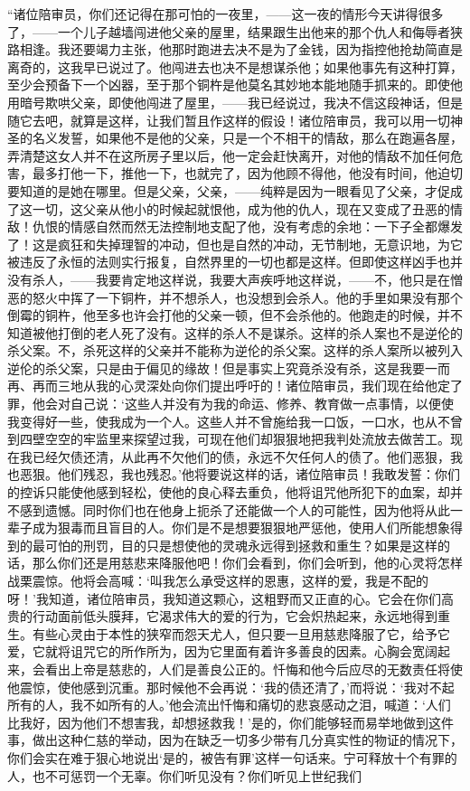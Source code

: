 \par “诸位陪审员，你们还记得在那可怕的一夜里，——这一夜的情形今天讲得很多了，——一个儿子越墙闯进他父亲的屋里，结果跟生出他来的那个仇人和侮辱者狭路相逢。我还要竭力主张，他那时跑进去决不是为了金钱，因为指控他抢劫简直是离奇的，这我早已说过了。他闯进去也决不是想谋杀他；如果他事先有这种打算，至少会预备下一个凶器，至于那个铜杵是他莫名其妙地本能地随手抓来的。即使他用暗号欺哄父亲，即使他闯进了屋里，——我已经说过，我决不信这段神话，但是随它去吧，就算是这样，让我们暂且作这样的假设！诸位陪审员，我可以用一切神圣的名义发誓，如果他不是他的父亲，只是一个不相干的情敌，那么在跑遍各屋，弄清楚这女人并不在这所房子里以后，他一定会赶快离开，对他的情敌不加任何危害，最多打他一下，推他一下，也就完了，因为他顾不得他，他没有时间，他迫切要知道的是她在哪里。但是父亲，父亲，——纯粹是因为一眼看见了父亲，才促成了这一切，这父亲从他小的时候起就恨他，成为他的仇人，现在又变成了丑恶的情敌！仇恨的情感自然而然无法控制地支配了他，没有考虑的余地：一下子全都爆发了！这是疯狂和失掉理智的冲动，但也是自然的冲动，无节制地，无意识地，为它被违反了永恒的法则实行报复，自然界里的一切也都是这样。但即使这样凶手也并没有杀人，——我要肯定地这样说，我要大声疾呼地这样说，——不，他只是在憎恶的怒火中挥了一下铜杵，并不想杀人，也没想到会杀人。他的手里如果没有那个倒霉的铜杵，他至多也许会打他的父亲一顿，但不会杀他的。他跑走的时候，并不知道被他打倒的老人死了没有。这样的杀人不是谋杀。这样的杀人案也不是逆伦的杀父案。不，杀死这样的父亲并不能称为逆伦的杀父案。这样的杀人案所以被列入逆伦的杀父案，只是由于偏见的缘故！但是事实上究竟杀没有杀，这是我要一而再、再而三地从我的心灵深处向你们提出呼吁的！诸位陪审员，我们现在给他定了罪，他会对自己说：‘这些人并没有为我的命运、修养、教育做一点事情，以便使我变得好一些，使我成为一个人。这些人并不曾施给我一口饭，一口水，也从不曾到四壁空空的牢监里来探望过我，可现在他们却狠狠地把我判处流放去做苦工。现在我已经欠债还清，从此再不欠他们的债，永远不欠任何人的债了。他们恶狠，我也恶狠。他们残忍，我也残忍。’他将要说这样的话，诸位陪审员！我敢发誓：你们的控诉只能使他感到轻松，使他的良心释去重负，他将诅咒他所犯下的血案，却并不感到遗憾。同时你们也在他身上扼杀了还能做一个人的可能性，因为他将从此一辈子成为狠毒而且盲目的人。你们是不是想要狠狠地严惩他，使用人们所能想象得到的最可怕的刑罚，目的只是想使他的灵魂永远得到拯救和重生？如果是这样的话，那么你们还是用慈悲来降服他吧！你们会看到，你们会听到，他的心灵将怎样战栗震惊。他将会高喊：‘叫我怎么承受这样的恩惠，这样的爱，我是不配的呀！’我知道，诸位陪审员，我知道这颗心，这粗野而又正直的心。它会在你们高贵的行动面前低头膜拜，它渴求伟大的爱的行为，它会炽热起来，永远地得到重生。有些心灵由于本性的狭窄而怨天尤人，但只要一旦用慈悲降服了它，给予它爱，它就将诅咒它的所作所为，因为它里面有着许多善良的因素。心胸会宽阔起来，会看出上帝是慈悲的，人们是善良公正的。忏悔和他今后应尽的无数责任将使他震惊，使他感到沉重。那时候他不会再说：‘我的债还清了，’而将说：‘我对不起所有的人，我不如所有的人。’他会流出忏悔和痛切的悲哀感动之泪，喊道：‘人们比我好，因为他们不想害我，却想拯救我！’是的，你们能够轻而易举地做到这件事，做出这种仁慈的举动，因为在缺乏一切多少带有几分真实性的物证的情况下，你们会实在难于狠心地说出‘是的，被告有罪’这样一句话来。宁可释放十个有罪的人，也不可惩罚一个无辜。你们听见没有？你们听见上世纪我们